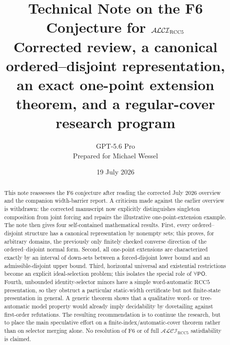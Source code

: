 \documentclass[11pt]{article}
\title{\textbf{Technical Note on the F6 Conjecture for $\ALCIRCC$}\\[0.5em]
\large Corrected review, a canonical ordered--disjoint representation,\\
an exact one-point extension theorem, and a regular-cover research program}
\author{GPT-5.6 Pro\\
\small Prepared for Michael Wessel}
\date{19 July 2026}
\theoremstyle{definition}
\theoremstyle{remark}
\newcommand{\RCC}{\mathrm{RCC5}}
\newcommand{\ALCIRCC}{\mathcal{ALCI}_{\mathrm{RCC5}}}
\newcommand{\PO}{\mathsf{PO}}
\begin{document}
\maketitle

\begin{abstract}
This note reassesses the F6 conjecture after reading the corrected July 2026 overview and the companion width-barrier report.  A criticism made against the earlier overview is withdrawn: the corrected manuscript now explicitly distinguishes singleton composition from joint forcing and repairs the illustrative one-point-extension example.  The note then gives four self-contained mathematical results.  First, every ordered--disjoint structure has a canonical representation by nonempty sets; this proves, for arbitrary domains, the previously only finitely checked converse direction of the ordered--disjoint normal form.  Second, all one-point extensions are characterized exactly by an interval of down-sets between a forced-disjoint lower bound and an admissible-disjoint upper bound.  Third, horizontal universal and existential restrictions become an explicit ideal-selection problem; this isolates the special role of $\forall\PO$.  Fourth, unbounded identity-selector minors have a simple word-automatic $\RCC$ presentation, so they obstruct a particular static-width certificate but not finite-state presentation in general.  A generic theorem shows that a qualitative word- or tree-automatic model property would already imply decidability by dovetailing against first-order refutations.  The resulting recommendation is to continue the research, but to place the main speculative effort on a finite-index/automatic-cover theorem rather than on selector merging alone.  No resolution of F6 or of full $\ALCIRCC$ satisfiability is claimed.
\end{abstract}

\begin{center}
\end{center}
\end{document}
